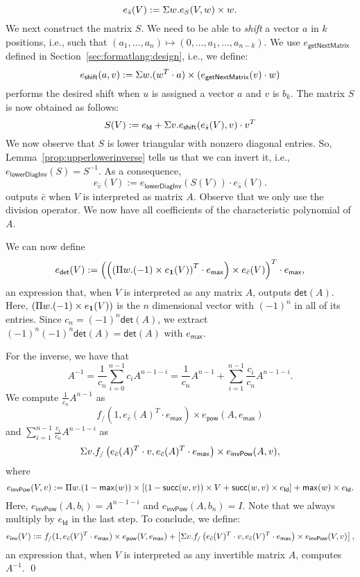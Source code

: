     $$
    e_{\bar s}(V):=\Sigma w.e_{S}(V,w)\times w.
    $$
    We next construct the matrix $S$. We need to be able to \textit{shift} a vector $a$ in $k$ positions, i.e.,
    such that $(a_1,\ldots,a_n)\mapsto (0,\ldots,a_1,\ldots,a_{n-k})$. We use $e_{\mathsf{getNextMatrix}}$ 
    defined in Section~\ref{sec:formatlang:design}, i.e., we define:
    $$
    e_{\mathsf{shift}}(a,v):=\Sigma w.(w^T\cdot a)\times(e_{\mathsf{getNextMatrix}}(v)\cdot w)
    $$
    performs the desired shift when $u$ is assigned a vector $a$ and $v$ is $b_k$. 
    The matrix $S$ is now obtained as follows:
    $$
    S(V):= e_{\mathsf{Id}} + \Sigma v. e_{\mathsf{shift}}(e_{\bar s}(V), v)\cdot v^T
    $$
    We now observe that $S$ is lower triangular with nonzero diagonal entries. So,
    Lemma~\ref{prop:upperlowerinverse} tells us that we can invert it, i.e.,
    $e_{\mathsf{lowerDiagInv}}(S)=S^{-1}$. As a consequence,
    $$
    e_{\bar c}(V):=e_{\mathsf{lowerDiagInv}}(S(V))\cdot e_{\bar s}(V).
    $$
    outputs $\bar c$ when $V$ is interpreted as matrix $A$. Observe that we only use the division operator. We now have all coefficients of the characteristic polynomial of $A$.


    We can now define
    $$
    e_{\mathsf{det}}(V):=\left( \left(\left( \Pi w. (-1)\times e_{\mathbf{1}}(V)\right)^T\cdot e_{\mathsf{max}}\right) \times e_{\bar c}(V) \right)^T\cdot e_{\mathsf{max}},
    $$
    an expression that, when $V$ is interpreted as any matrix $A$, outputs $\mathsf{det}(A)$.
    Here, $(\Pi w. (-1)\times e_{\mathbf{1}}(V))$ is the $n$ dimensional vector with $(-1)^n$ in all of its entries.
    Since $c_n=(-1)^n\mathsf{det}(A)$, we extract $(-1)^n(-1)^n\mathsf{det}(A)=\mathsf{det}(A)$ with $e_{\mathsf{max}}$.

    For the inverse, we have that
    $$
    A^{-1}=\frac{1}{c_n}\sum_{i=0}^{n-1}c_i A^{n-1-i} = \frac{1}{c_n}A^{n-1} + \sum_{i=1}^{n-1}\frac{c_i}{c_n}A^{n-1-i}.
    $$
    We compute $\frac{1}{c_n}A^{n-1}$ as
    $$
    f_{/}(1, e_{\bar c}(A)^T\cdot e_{\mathsf{max}})\times e_{\mathsf{pow}}(A, e_{\mathsf{max}})
    $$
    and $\sum_{i=1}^{n-1}\frac{c_i}{c_n}A^{n-1-i}$ as
    $$
    \Sigma v. f_{/}\left( e_{\bar c}(A)^T\cdot v, e_{\bar c}(A)^T\cdot e_{\mathsf{max}} \right)\times e_{\mathsf{invPow}}(A, v),
    $$
    where
    $$
    e_{\mathsf{invPow}}(V, v):= \Pi w. (1-\mathsf{max}(w)) \times \left[ (1 - \mathsf{succ}(w,v))\times V + \mathsf{succ}(w,v)\times e_{\mathsf{Id}} \right] + \mathsf{max}(w)\times e_{\mathsf{Id}}.
    $$
    Here, $e_{\mathsf{invPow}}(A, b_i)=A^{n-1-i}$ and $e_{\mathsf{invPow}}(A, b_n)=I$.
    Note that we always multiply by $e_{\mathsf{Id}}$ in the last step.
    To conclude, we define:
    $$
    e_{\mathsf{inv}}(V):= f_{/}(1, e_{\bar c}(V)^T\cdot e_{\mathsf{max}})\times e_{\mathsf{pow}}(V, e_{\mathsf{max}}) + \left[ \Sigma v. f_{/}\left( e_{\bar c}(V)^T\cdot v, e_{\bar c}(V)^T\cdot e_{\mathsf{max}} \right)\times e_{\mathsf{invPow}}(V, v) \right],
    $$
    an expression that, when $V$ is interpreted as any invertible matrix $A$, computes $A^{-1}$. \qed

